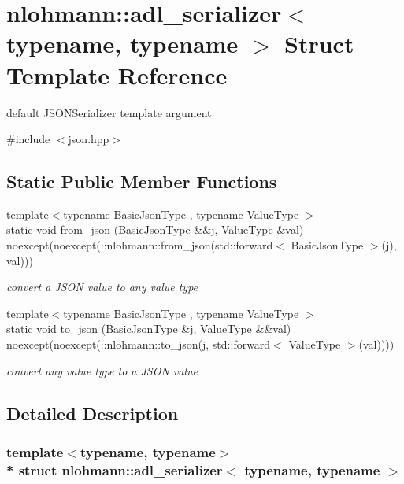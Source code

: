 \hypertarget{structnlohmann_1_1adl__serializer}{}\section{nlohmann\+:\+:adl\+\_\+serializer$<$ typename, typename $>$ Struct Template Reference}
\label{structnlohmann_1_1adl__serializer}


default J\+S\+O\+N\+Serializer template argument  




{\ttfamily \#include $<$json.\+hpp$>$}

\subsection*{Static Public Member Functions}
\begin{DoxyCompactItemize}
\item 
{\footnotesize template$<$typename Basic\+Json\+Type , typename Value\+Type $>$ }\\static void \hyperlink{structnlohmann_1_1adl__serializer_ab39cad07c1a2bf4414d6cae5215b4e7a}{from\+\_\+json} (Basic\+Json\+Type \&\&j, Value\+Type \&val) noexcept(noexcept(\+::nlohmann\+::from\+\_\+json(std\+::forward$<$ Basic\+Json\+Type $>$(j), val)))
\begin{DoxyCompactList}\small\item\em convert a J\+S\+ON value to any value type \end{DoxyCompactList}\item 
{\footnotesize template$<$typename Basic\+Json\+Type , typename Value\+Type $>$ }\\static void \hyperlink{structnlohmann_1_1adl__serializer_adf8cd96afe6ab243b67392dfe35ace89}{to\+\_\+json} (Basic\+Json\+Type \&j, Value\+Type \&\&val) noexcept(noexcept(\+::nlohmann\+::to\+\_\+json(j, std\+::forward$<$ Value\+Type $>$(val))))
\begin{DoxyCompactList}\small\item\em convert any value type to a J\+S\+ON value \end{DoxyCompactList}\end{DoxyCompactItemize}


\subsection{Detailed Description}
\subsubsection*{template$<$typename, typename$>$\\*
struct nlohmann\+::adl\+\_\+serializer$<$ typename, typename $>$}

